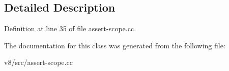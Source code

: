 \subsection{Detailed Description}


Definition at line 35 of file assert-\/scope.\+cc.



The documentation for this class was generated from the following file\+:\begin{DoxyCompactItemize}
\item 
v8/src/assert-\/scope.\+cc\end{DoxyCompactItemize}
